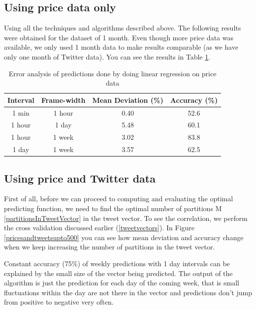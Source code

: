 \documentclass[a4paper,11pt,oneside]{article}
\begin{document}
  \subsection{Using price data only}
  Using all the techniques and algorithms described above. The following results were obtained for the dataset of 1 month. Even though more price data was available, we only used 1 month data to make results comparable (as we have only one month of Twitter data). You can see the results in Table \ref{tablePriceOnly}.
  \begin{table}[h!]
  \begin{center}
  	\begin{tabular}{|c c c c|} 
  		\hline
  		Interval & Frame-width & Mean Deviation (\%) & Accuracy (\%) \\ [0.5ex] 
  		\hline\hline
  		1 min & 1 hour & 0.40 & 52.6 \\ 
  		\hline
  		1 hour & 1 day & 5.48 & 60.1 \\
  		\hline
  		1 hour & 1 week & 3.02 & 83.8 \\
  		\hline
  		1 day & 1 week & 3.57 & 62.5 \\
  		\hline
  	\end{tabular}
  	\caption{Error analysis of predictions done by doing linear regression on price data}
  	\label{tablePriceOnly}
  \end{center}
  \end{table}
  \subsection{Using price and Twitter data}
  
  \label{pricesandtweets}
  First of all, before we can proceed to computing and evaluating the optimal predicting function, we need to find the optimal number of partitions M \eqref{partitionsInTweetVector} in the tweet vector. To see the correlation, we perform the cross validation discussed earlier (\ref{tweetvectors}). In Figure \ref{pricesandtweetsupto500} you can see how mean deviation and accuracy change when we keep increasing the number of partitions in the tweet vector. 
  
  Constant accuracy (75\%) of weekly predictions with 1 day intervals can be explained by the small size of the vector being predicted. The output of the algorithm is just the prediction for each day of the coming week, that is small fluctuations within the day are not there in the vector and predictions don't jump from positive to negative very often.
  
\end{document}
